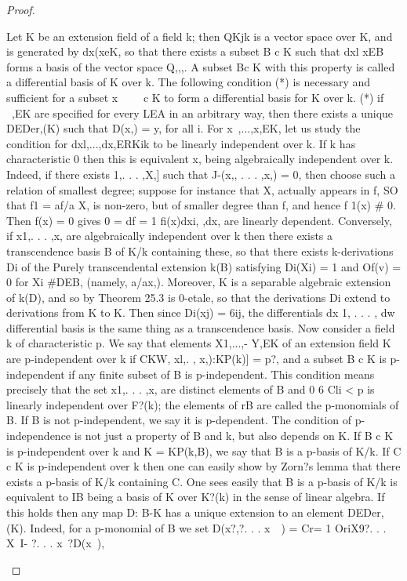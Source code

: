 \begin{proof}
\begin{mathematicalrecord}
{Let K be an extension field of a field k; then QKjk is a vector space over
K, and is generated by {dx(xeK},              so that there exists a subset B c K
such that {dxl xEB} forms a basis of the vector space Q,,,. A subset
Bc K with this property is called a differential basis of K over k. The
following condition (*) is necessary and sufficient for a subset {x~}~~~ c K
to form a differential basis for K over k.
   (*) if ~,EK are specified for every LEA in an arbitrary way, then there
exists a unique DEDer,(K) such that D(x,) = y, for all i.
    For x~,...,x,EK,       let us study the condition for dxl,...,dx,ERKik      to be
linearly independent over k. If k has characteristic 0 then this is equivalent
            x, being algebraically independent over k. Indeed, if there exists
                  1,. . . ,X,] such that J-(x,, . . . ,x,) = 0, then choose such a
relation of smallest degree; suppose for instance that X, actually appears in
f, SO that f1 = af/a X, is non-zero, but of smaller degree than f, and hence
f 1(x) # 0. Then f(x) = 0 gives
           0 = df = 1 fi(x)dxi,
                    ,dx, are linearly dependent. Conversely, if x1,. . . ,x, are
algebraically independent over k then there exists a transcendence basis
B of K/k containing        these, so that there exists k-derivations Di of the Purely
transcendental        extension k(B) satisfying
              Di(Xi) = 1 and Of(v) = 0 for Xi #DEB,
(namely, a/ax,). Moreover, K is a separable algebraic extension of k(D),
and so by Theorem 25.3 is 0-etale, so that the derivations Di extend to
derivations from K to K. Then since Di(xj) = 6ij, the differentials
dx 1, . . . , dw%
differential basis is the same thing as a transcendence basis.
    Now consider a field k of characteristic p. We say that elements
X1,...,-   Y,EK of an extension field K are p-independent over k if
 CKW, xl,. , x,):KP(k)]          = p?, and a subset B c K is p-independent if any
finite subset of B is p-independent. This condition means precisely that the
set
                               x1,. . . ,x, are distinct
                               elements of B and 0 6 Cli < p
is linearly independent over F?(k); the elements of rB are called the
p-monomials of B. If B is not p-independent, we say it is p-dependent.
The condition of p-independence is not just a property of B and k, but
also depends on K. If B c K is p-independent over k and K = KP(k,B),
we say that B is a p-basis of K/k. If C c K is p-independent over k then
one can easily show by Zorn?s lemma that there exists a p-basis of K/k
 containing C.
    One sees easily that B is a p-basis of K/k is equivalent to IB being a
basis of K over K?(k) in the sense of linear algebra. If this holds then any
map D: B-K             has a unique extension to an element DEDer,(K). Indeed,
for a p-monomial of B we set
           D(x?,?. . . x~~)   = Cr=   1 OriX9?.   . . X~I-   ?. . . x~?D(x~),

}
\end{mathematicalrecord}
\end{proof}
